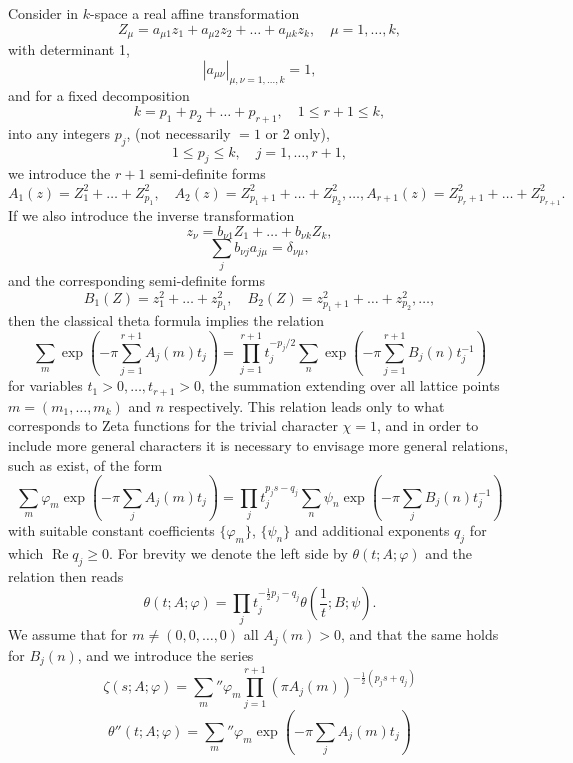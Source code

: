 \documentclass[12pt]{article}
\begin{document}
Consider in \(k\)-space a real affine transformation
\[
Z_\mu = a_{\mu 1} z_1 + a_{\mu 2} z_2 + \dots + a_{\mu k} z_k, \quad \mu = 1, \dots, k,
\]
with determinant 1,
\[
|a_{\mu\nu}|_{\mu,\nu=1,\dots,k} = 1,
\]
and for a fixed decomposition
\[
k = p_1 + p_2 + \dots + p_{r+1}, \quad 1 \le r + 1 \le k,
\]
into any integers \(p_j\), (not necessarily \(= 1\) or 2 only),
\[
1 \le p_j \le k, \quad j = 1, \dots, r + 1,
\]
we introduce the \(r + 1\) semi-definite forms
\[
A_1(z) = Z_1^2 + \dots + Z_{p_1}^2, \quad A_2(z) = Z_{p_1+1}^2 + \dots + Z_{p_2}^2, \dots, A_{r+1}(z) = Z_{p_r+1}^2 + \dots + Z_{p_{r+1}}^2.
\]
If we also introduce the inverse transformation
\[
z_\nu = b_{\nu 1}Z_1 + \dots + b_{\nu k}Z_k,
\]
\[
\sum_j b_{\nu j} a_{j\mu} = \delta_{\nu\mu},
\]
and the corresponding semi-definite forms
\[
B_1(Z) = z_1^2 + \dots + z_{p_1}^2, \quad B_2(Z) = z_{p_1+1}^2 + \dots + z_{p_2}^2, \dots,
\]
then the classical theta formula implies the relation
\[
\sum_m \exp \left(-\pi \sum_{j=1}^{r+1} A_j(m)t_j\right) = \prod_{j=1}^{r+1} t_j^{-p_j/2} \sum_n \exp \left(-\pi \sum_{j=1}^{r+1} B_j(n)t_j^{-1}\right)
\]
for variables \(t_1 > 0, \dots, t_{r+1} > 0\), the summation extending over all lattice points \(m = (m_1, \dots, m_k)\) and \(n\) respectively. This relation leads only to what corresponds to Zeta functions for the trivial character \(\chi = 1\), and in order to include more general characters it is necessary to envisage more general relations, such as exist, of the form
\[
\sum_m \varphi_m \exp \left(-\pi \sum_j A_j(m)t_j\right) = \prod_j t_j^{p_j s - q_j} \sum_n \psi_n \exp \left(-\pi \sum_j B_j(n)t_j^{-1}\right)
\]
with suitable constant coefficients \(\{\varphi_m\}\), \(\{\psi_n\}\) and additional exponents \(q_j\) for which \(\operatorname{Re} q_j \ge 0\). For brevity we denote the left side by \(\theta(t; A; \varphi)\) and the relation then reads
\begin{equation}
\theta(t; A; \varphi) = \prod_j t_j^{-\frac{1}{2}p_j-q_j} \theta\left(\frac{1}{t}; B; \psi\right).
\tag{199}
\end{equation}
We assume that for \(m \ne (0, 0, \dots, 0)\) all \(A_j(m) > 0\), and that the same holds for \(B_j(n)\), and we introduce the series
\begin{equation}
\zeta(s; A; \varphi) = \sum_m'' \varphi_m \prod_{j=1}^{r+1} (\pi A_j(m))^{-\frac{1}{2}(p_j s + q_j)}
\tag{200}
\end{equation}
\begin{equation}
\theta''(t; A; \varphi) = \sum_m'' \varphi_m \exp \left( -\pi \sum_j A_j(m)t_j \right)
\tag{201}
\end{equation}
\end{document}

